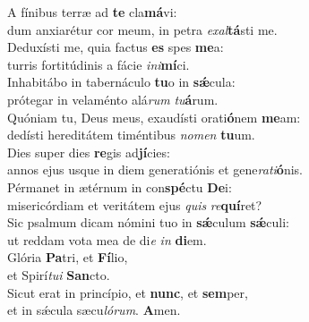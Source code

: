 \evenverse A fínibus terræ ad \textbf{te} cla\textbf{má}vi:~\*\\
\evenverse dum anxiarétur cor meum, in petra \textit{e}\textit{xal}\textbf{tá}sti me.\\
\oddverse Deduxísti me, quia factus \textbf{es} spes \textbf{me}a:~\*\\
\oddverse turris fortitúdinis a fácie \textit{i}\textit{ni}\textbf{mí}ci.\\
\evenverse Inhabitábo in tabernáculo \textbf{tu}o in \textbf{sǽ}cula:~\*\\
\evenverse prótegar in velaménto alá\textit{rum} \textit{tu}\textbf{á}rum.\\
\oddverse Quóniam tu, Deus meus, exaudísti orati\textbf{ó}nem \textbf{me}am:~\*\\
\oddverse dedísti hereditátem timéntibus \textit{no}\textit{men} \textbf{tu}um.\\
\evenverse Dies super dies \textbf{re}gis ad\textbf{jí}cies:~\*\\
\evenverse annos ejus usque in diem generatiónis et gene\textit{ra}\textit{ti}\textbf{ó}nis.\\
\oddverse Pérmanet in ætérnum in con\textbf{spé}ctu \textbf{De}i:~\*\\
\oddverse misericórdiam et veritátem ejus \textit{quis} \textit{re}\textbf{quí}ret?\\
\evenverse Sic psalmum dicam nómini tuo in \textbf{sǽ}culum \textbf{sǽ}culi:~\*\\
\evenverse ut reddam vota mea de di\textit{e} \textit{in} \textbf{di}em.\\
\oddverse Glória \textbf{Pa}tri, et \textbf{Fí}lio,~\*\\
\oddverse et Spirí\textit{tu}\textit{i} \textbf{San}cto.\\
\evenverse Sicut erat in princípio, et \textbf{nunc}, et \textbf{sem}per,~\*\\
\evenverse et in sǽcula sæcu\textit{ló}\textit{rum}. \textbf{A}men.\\
